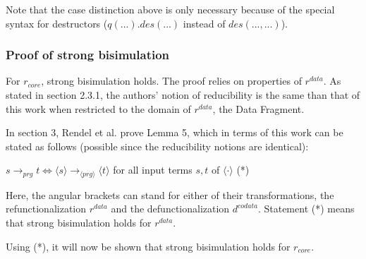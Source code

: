 Note that the case distinction above is only necessary because of the special syntax for destructors ($q(...).des(...)$ instead of $des(..., ...)$).

\subsubsection{Proof of strong bisimulation}

For $r_{core}$, strong bisimulation holds. The proof relies on properties of $r^{data}$. As stated in section 2.3.1, the authors' notion of reducibility is the same than that of this work when restricted to the domain of $r^{data}$, the Data Fragment.

In section 3, Rendel et al. prove Lemma 5, which in terms of this work can be stated as follows (possible since the reducibility notions are identical):

$s \longrightarrow_{prg} t \iff \langle s \rangle \longrightarrow_{\langle prg \rangle} \langle t \rangle$ for all input terms $s,t$ of $\langle \cdot \rangle$ (*)

Here, the angular brackets can stand for either of their transformations, the refunctionalization $r^{data}$ and the defunctionalization $d^{codata}$. Statement (*) means that strong bisimulation holds for $r^{data}$.

Using (*), it will now be shown that strong bisimulation holds for $r_{core}$.

